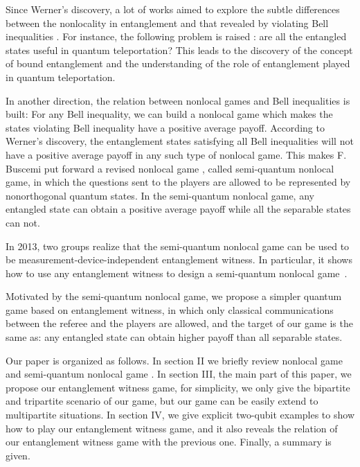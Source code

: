 \documentclass[twocolumn,pra,showpacs,superscriptaddress]{revtex4-1}
\begin{document}
Since Werner's discovery, a lot of works aimed to explore the subtle
differences between the nonlocality in entanglement and that revealed
by violating Bell inequalities \cite{hor}\cite{mas}\cite{met}. For
instance, the following problem is raised \cite{pop}\cite{hor3}: are
all the entangled states useful in quantum teleportation? This leads
to the discovery of the concept of bound entanglement and the
understanding of the role of entanglement played in quantum
teleportation.

In another direction, the relation between nonlocal games and Bell
inequalities is built: For any Bell inequality, we can build a
nonlocal game \cite{sil}\cite{cle} which makes the states violating
Bell inequality have a positive average payoff. According to Werner's
discovery, the entanglement states satisfying all Bell inequalities
will not have a positive average payoff in any such type of nonlocal
game. This makes F. Buscemi put forward a revised nonlocal game
\cite{bus}, called semi-quantum nonlocal game, in which the questions
sent to the players are allowed to be represented by nonorthogonal
quantum states. In the semi-quantum nonlocal game, any entangled state
can obtain a positive average payoff while all the separable states
can not.

In 2013, two groups \cite{bra}\cite{cav} realize that the semi-quantum
nonlocal game can be used to be measurement-device-independent
entanglement witness\cite{hor}. In particular, it shows how to use any
entanglement witness to design a semi-quantum nonlocal
game~\cite{bra}.

Motivated by the semi-quantum nonlocal game, we propose a simpler
quantum game based on entanglement witness, in which only classical
communications between the referee and the players are allowed, and the target of our game is the
same as\cite{bus}: any entangled state can obtain higher payoff than
all separable states.



Our paper is organized as follows. In section II we briefly review
nonlocal game\cite{cle} and semi-quantum nonlocal game \cite{bus}. In
section III, the main part of this paper, we propose our entanglement witness game,
for simplicity, we only give the bipartite and tripartite
scenario of our game, but our game can be easily extend to
multipartite situations. In section IV, we give explicit two-qubit
examples to show how to play our entanglement witness game, and it also reveals the
relation of our entanglement witness game with the previous one. Finally, a
summary is given.
\end{document}
